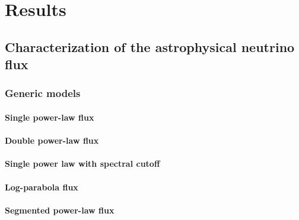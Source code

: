 \chapter{Results}

\section{Characterization of the astrophysical neutrino flux\label{sec:diffuse}}
\begingroup
\graphicspath{{results/HESE_Final_Paper/}}

\endgroup

\subsection{Generic models\label{sec:generic_models}}
\begingroup
\graphicspath{{results/HESE_Final_Paper/}}

\endgroup

\subsubsection{Single power-law flux\label{sec:spl}}
\begingroup
\graphicspath{{results/HESE_Final_Paper/}}

\endgroup

\subsubsection{Double power-law flux\label{sec:dpl}}
\begingroup
\graphicspath{{results/HESE_Final_Paper/}}

\endgroup

\subsubsection{Single power law with spectral cutoff\label{sec:cutoff}}
\begingroup
\graphicspath{{results/HESE_Final_Paper/}}

\endgroup

\subsubsection{Log-parabola flux\label{sec:log_parabola}}
\begingroup
\graphicspath{{results/HESE_Final_Paper/}}

\endgroup

\subsubsection{Segmented power-law flux\label{sec:unfolding}}
\begingroup
\graphicspath{{results/HESE_Final_Paper/}}

\endgroup


